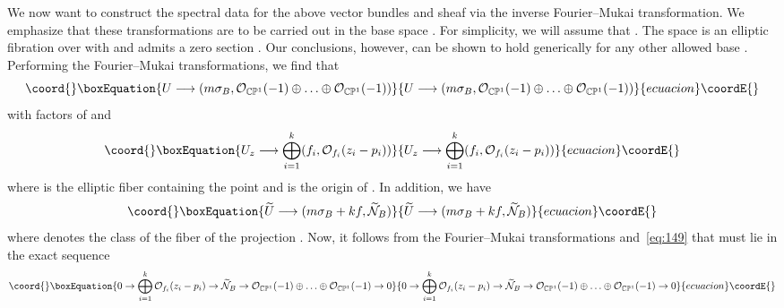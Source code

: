 \documentclass[a4paper,12pt]{article}
\numberwithin{equation}{section}
\providecommand{\cp}[1]{{\mathbb C}{\mathbb P}^{#1}}
\def\cN{{\mathcal N}}
\def\cO{{\mathcal O}}
\theoremstyle{plain}
\begin{document}
We now want to construct the spectral data for the above vector bundles and sheaf
via the inverse Fourier--Mukai transformation. We emphasize that these
transformations are to be carried out in the base space \coordHE{}. For simplicity,
we will assume that \coordHE{}. The space \coordHE{} is an elliptic 
fibration over \myHighlight{$\cp{1} \rm$}\coordHE{} with \myHighlight{$\pi_{B}:dP_{9} \rightarrow \cp{1} \rm$}\coordHE{}
and admits a zero section \coordHE{}. Our conclusions, 
however, can be shown to hold generically for any other 
allowed base \coordHE{} \cite{mathpaper}. 
Performing the Fourier--Mukai transformations, we find that
\begin{equation}\coord{}\boxEquation{
U \longrightarrow (m\sigma_{B}, {\mathcal O}_{\cp{1}}(-1)\oplus 
\ldots \oplus {\mathcal O}_{\cp{1}}(-1))
\label{eq:154}
}{
U \longrightarrow (m\sigma_{B}, {\mathcal O}_{\cp{1}}(-1)\oplus 
\ldots \oplus {\mathcal O}_{\cp{1}}(-1))
}{ecuacion}\coordE{}\end{equation}
with \coordHE{} factors of \myHighlight{${\mathcal O}_{\cp{1}}(-1)$}\coordHE{} and
\begin{equation}\coord{}\boxEquation{
U_{z} \longrightarrow \bigoplus_{i=1}^{k}
(f_{i}, \cO_{f_{i}}(z_{i}-p_{i}))
\label{eq:155}
}{
U_{z} \longrightarrow \bigoplus_{i=1}^{k}
(f_{i}, \cO_{f_{i}}(z_{i}-p_{i}))
}{ecuacion}\coordE{}\end{equation}
where \coordHE{} is the elliptic fiber containing
the point \coordHE{} and \coordHE{} is the
origin of \coordHE{}.
In addition, we have
\begin{equation}\coord{}\boxEquation{
\widetilde{U} \longrightarrow (m\sigma_{B} + kf, \widetilde{\cN}_{B})
\label{eq:156}
}{
\widetilde{U} \longrightarrow (m\sigma_{B} + kf, \widetilde{\cN}_{B})
}{ecuacion}\coordE{}\end{equation}
where \coordHE{} denotes the class of the fiber of
the projection \myHighlight{$\pi_{B} : B \to \cp{1}$}\coordHE{}. 
Now, it follows from the Fourier--Mukai transformations and~\eqref{eq:149}
that \myHighlight{$\widetilde{\cN}_{B}$}\coordHE{} must lie in the exact sequence
\begin{equation}\coord{}\boxEquation{
0 \rightarrow \bigoplus_{i=1}^{k}\cO_{f_{i}}(z_{i}-p_{i})
\rightarrow \widetilde{\cN}_{B} \rightarrow 
{\mathcal O}_{\cp{1}}(-1)\oplus 
\ldots \oplus {\mathcal O}_{\cp{1}}(-1)
\rightarrow 0
\label{eq:157}
}{
0 \rightarrow \bigoplus_{i=1}^{k}\cO_{f_{i}}(z_{i}-p_{i})
\rightarrow \widetilde{\cN}_{B} \rightarrow 
{\mathcal O}_{\cp{1}}(-1)\oplus 
\ldots \oplus {\mathcal O}_{\cp{1}}(-1)
\rightarrow 0
}{ecuacion}\coordE{}\end{equation}
\end{document}

